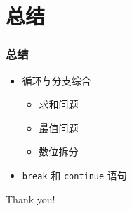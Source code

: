 \section{总结}

\begin{frame}[fragile]
    \frametitle{总结}

    \begin{itemize}
        \item 循环与分支综合
            \begin{itemize}
                \item 求和问题
                \item 最值问题
                \item 数位拆分
            \end{itemize}
        \item \lstinline|break| 和 \lstinline|continue| 语句
    \end{itemize}
\end{frame}

\begin{frame}
    \begin{center}
        {\Huge Thank you!}
    \end{center}
\end{frame}


